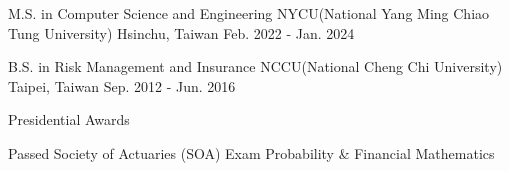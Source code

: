 

\begin{cventries}

  \cventry
    {M.S. in Computer Science and Engineering} %
    {NYCU(National Yang Ming Chiao Tung University)} %
    {Hsinchu, Taiwan} %
    {Feb. 2022 - Jan. 2024} %
    {
      \begin{cvitems} %
      \end{cvitems}
    }

  \cventry
    {B.S. in Risk Management and Insurance} %
    {NCCU(National Cheng Chi University)} %
    {Taipei, Taiwan} %
    {Sep. 2012 - Jun. 2016} %
    {
      \begin{cvitems} %
        \item {Presidential Awards}
        \item {Passed Society of Actuaries (SOA) Exam Probability \& Financial Mathematics}
      \end{cvitems}
    }

\end{cventries}
